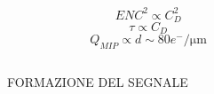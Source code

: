 \begin{frame}
\begin{columns}
\begin{equation*}
                    \hspace{80pt} ENC^2 \propto C_D ^2
                \end{equation*}  
                \begin{equation*}
                    \hspace{80pt} \tau \propto C_D
                \end{equation*}  
                \begin{equation*}
                    \hspace{80pt} Q_{MIP}\propto d \sim 80 e^-/\si{\um}
                \end{equation*}  
            \end{columns}   
        \medskip 
        FORMAZIONE DEL SEGNALE
    \end{frame} 

